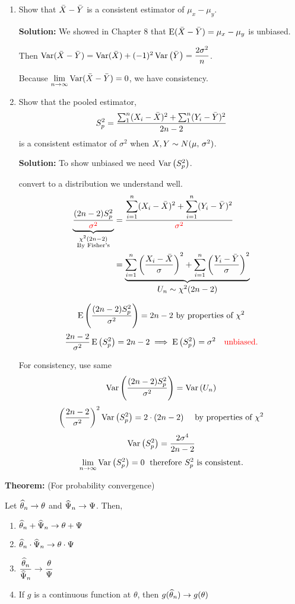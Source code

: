 \begin{enumerate}[label=\textbf{\alph*}.) ]
	\item
		Show that $\bar{X} - \bar{Y}$ is a consistent estimator of $\mu_x - \mu_y$.
		
		\nl \textbf{Solution:} We showed in Chapter 8 that $\E*{\Xbar - \Ybar} = \mu_x - \mu_y$ is unbiased.

		\nl Then $\Var*{\Xbar -\Ybar} = \Var*{\Xbar} + (-1)^2\Var{\Ybar} = \dfrac{2\sigma^2}{n}$.

		\nl Because $\displaystyle \limn \Var*{\Xbar -\Ybar} = 0$, we have consistency. 

	\item
		Show that the pooled estimator,
		$$S^2_p = \frac{\sum_1^n (X_i - \bar{X})^2 + \sum_1^n(Y_i - \bar{Y})^2}{2n-2}$$
		is a consistent estimator of $\sigma^2$ when $X, Y \sim \normalDist*$.

		\nl \textbf{Solution:} To show unbiased we need $\Var{S_p^2}$.

		\nl {} convert to a distribution we understand well.
        \begin{align*}
		\underbrace{\frac{(2n-2)S_p^2}{\color{red}\sigma^2\color{black}}}_{\substack{\chi^2(2n-2)\\ \text{By Fisher's}} } &= \frac{\displaystyle \sum_{i=1}^n (X_i - \Xbar)^2 + \sum_{i=1}^n(Y_i - \Ybar)^2}{\color{red}\sigma^2\color{black}}\\
		&= \underbrace{\sum_{i=1}^n \pars{\frac{X_i - \Xbar}{\sigma}}^2 + \sum_{i=1}^n \pars{\frac{Y_i - \Ybar}{\sigma}}^2}_{\textstyle U_n \sim \chi^2 (2n-2)}
		\end{align*}

		$$\E{\frac{(2n-2)S_p^2}{\sigma^2}} = 2n-2 \text{ by properties of } \chi^2$$
		$$\frac{2n-2}{\sigma^2} \E{S_p^2} = 2n-2 \implies \E{S_p^2} = \sigma^2 \quad \text{\red{unbiased.}}$$
		
        \nnl For consistency, use same 
		$$\Var{\frac{(2n-2)S_p^2}{\sigma^2}} = \Var{U_n}$$
		$$\pars{\frac{2n-2}{\sigma^2}}^2 \Var{S_p^2} = 2\cdot(2n-2)\quad \text{ by properties of } \chi^2$$
		$$\Var{S_p^2} = \frac{2\sigma^4}{2n-2}$$
		$$\limn \Var{S_p^2} = 0 \;\text{ therefore } S_p^2 \text{ is consistent.}$$
\end{enumerate}

\newpage\noindent \textbf{Theorem:}  (For probability convergence)

\nl Let $\widehat{\theta}_n \to \theta$ and $\widehat{\Psi}_n \to \Psi$. Then,
\begin{enumerate}[label=\textcircled{\raisebox{-1pt}{\arabic*}}]
\item $\widehat{\theta}_n + \widehat{\Psi}_n \to \theta + \Psi$
\item $\widehat{\theta}_n \cdot \widehat{\Psi}_n \to \theta \cdot \Psi$
\item $\dfrac{\widehat{\theta}_n}{\widehat{\Psi}_n} \to \dfrac{\theta}{\Psi}$
\item If $g$ is a continuous function at $\theta$, then $g(\widehat{\theta}_n) \to g(\theta)$
\end{enumerate}

